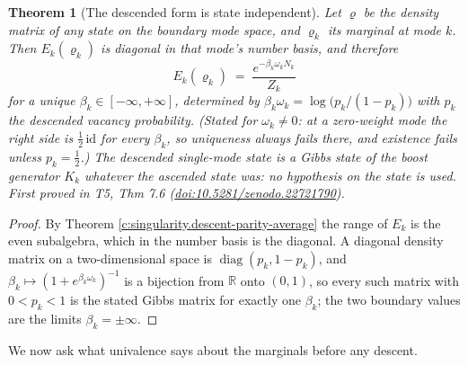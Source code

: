 \documentclass[11pt]{article}
\newtheorem{theorem}{Theorem}[section]
\theoremstyle{definition}
\theoremstyle{plain}
\providecommand{\R}{}\renewcommand{\R}{\mathbb{R}}
\begin{document}
\begin{theorem}[The descended form is state independent]\label{c:singularity.descended-form-state-independent}
Let $\varrho$ be the density matrix of \emph{any} state on the boundary mode space, and $\varrho_k$ its marginal at mode $k$. Then $E_k(\varrho_k)$ is diagonal in that mode's number basis, and therefore
\[
E_k(\varrho_k) \;=\; \frac{e^{-\beta_k \omega_k N_k}}{Z_k}
\]
for a unique $\beta_k \in [-\infty, +\infty]$, determined by $\beta_k\omega_k = \log\bigl(p_k/(1-p_k)\bigr)$ with $p_k$ the descended vacancy probability. (Stated for $\omega_k \neq 0$: at a zero-weight mode the right side is $\tfrac12\,\mathrm{id}$ for every $\beta_k$, so uniqueness always fails there, and existence fails unless $p_k = \tfrac12$.) The descended single-mode state is a Gibbs state of the boost generator $K_k$ whatever the ascended state was: no hypothesis on the state is used.
\emph{First proved in} T5, Thm 7.6 (\href{https://doi.org/10.5281/zenodo.22721790}{doi:10.5281/zenodo.22721790}).
\end{theorem}
\begin{proof}
By Theorem \ref{c:singularity.descent-parity-average} the range of $E_k$ is the even subalgebra, which in the number basis is the diagonal. A diagonal density matrix on a two-dimensional space is $\operatorname{diag}(p_k, 1 - p_k)$, and $\beta_k \mapsto (1 + e^{\beta_k\omega_k})^{-1}$ is a bijection from $\R$ onto $(0,1)$, so every such matrix with $0 < p_k < 1$ is the stated Gibbs matrix for exactly one $\beta_k$; the two boundary values are the limits $\beta_k = \pm\infty$.

\end{proof}

We now ask what univalence says about the marginals before any descent.
\end{document}
